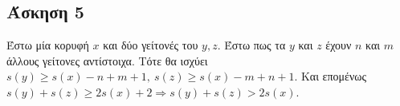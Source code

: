 \newpage\subsection*{Άσκηση 5}
Έστω μία κορυφή $x$ και δύο γείτονές του $y, z$. Έστω πως τα $y$ και $z$ έχουν $n$ και $m$ άλλους γείτονες αντίστοιχα.
Τότε θα ισχύει $s(y) \ge s(x) - n + m + 1,\ s(z) \ge s(x) - m + n + 1$. Και επομένως $s(y) + s(z) \ge 2s(x) + 2 \Rightarrow s(y) + s(z) > 2s(x)$.
